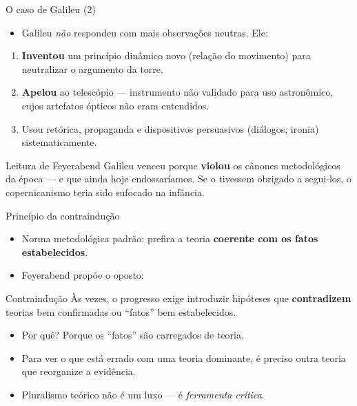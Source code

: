 \documentclass[aspectratio=169]{beamer}
\newcommand{\impt}[1]{\textcolor{maccent}{\textbf{#1}}}
\newcommand{\ntc}[1]{\textcolor{mprimary}{#1}}
\begin{document}
\begin{frame}{O caso de Galileu (2)}
\begin{itemize}
    \item Galileu \emph{n\~ao} respondeu com mais observa\c c\~oes neutras. Ele:
\end{itemize}
\vspace{0.2cm}
\begin{enumerate}
    \item \impt{Inventou} um princ\'ipio din\^amico novo (rela\c c\~ao do movimento) para neutralizar o argumento da torre.
    \item \impt{Apelou} ao telesc\'opio --- instrumento \ntc{n\~ao validado} para uso astron\^omico, cujos artefatos \'opticos n\~ao eram entendidos.
    \item Usou ret\'orica, propaganda e dispositivos persuasivos (di\'alogos, ironia) sistematicamente.
\end{enumerate}
\vspace{0.4cm}
\begin{alertblock}{Leitura de Feyerabend}
Galileu venceu porque \impt{violou} os c\^anones metodol\'ogicos da \'epoca --- e que ainda hoje endossar\'iamos. Se o tivessem obrigado a segui-los, o copernicanismo teria sido sufocado na inf\^ancia.
\end{alertblock}
\end{frame}

\begin{frame}{Princ\'ipio da contraindu\c c\~ao}
\begin{itemize}
    \item Norma metodol\'ogica padr\~ao: prefira a teoria \impt{coerente com os fatos estabelecidos}.
    \item Feyerabend prop\~oe o oposto:
\end{itemize}
\vspace{0.3cm}
\begin{block}{Contraindu\c c\~ao}
\`As vezes, o progresso exige introduzir hip\'oteses que \impt{contradizem} teorias bem confirmadas ou ``fatos'' bem estabelecidos.
\end{block}
\vspace{0.3cm}
\begin{itemize}
    \item Por qu\^e? Porque os ``fatos'' s\~ao carregados de teoria.
    \item Para ver o que est\'a errado com uma teoria dominante, \'e preciso \ntc{outra} teoria que reorganize a evid\^encia.
    \item Pluralismo te\'orico n\~ao \'e um luxo --- \'e \emph{ferramenta cr\'itica}.
\end{itemize}
\end{frame}
\end{document}
